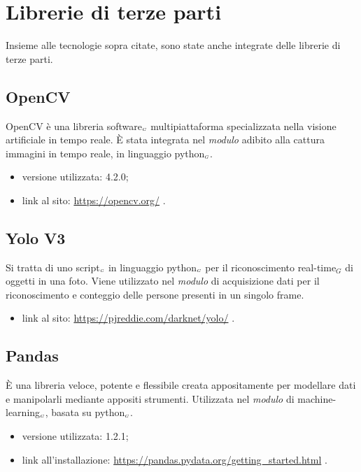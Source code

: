 \section{Librerie di terze parti}\label{LibrerieDiTerzeParti}
Insieme alle tecnologie sopra citate, sono state anche integrate delle librerie di terze parti.

\subsection{OpenCV}\label{LibrerieOpenCV}
OpenCV è una libreria software$_{\scaleto{G}{3pt}}$ multipiattaforma specializzata nella visione artificiale in tempo reale.
È stata integrata nel \textit{modulo} adibito alla cattura immagini in tempo reale, in linguaggio python$_{\scaleto{G}{3pt}}$.

\begin{itemize}
  \item versione utilizzata: 4.2.0;
  \item link al sito: \url{https://opencv.org/} .
\end{itemize}

\subsection{Yolo V3}\label{LibrerieYoloV3}
Si tratta di uno script$_{\scaleto{G}{3pt}}$ in linguaggio python$_{\scaleto{G}{3pt}}$ per il riconoscimento real-time$_G$ di oggetti in una foto.
Viene utilizzato nel \textit{modulo} di acquisizione dati per il riconoscimento e conteggio delle persone presenti in un singolo frame.

\begin{itemize}
  \item link al sito: \url{https://pjreddie.com/darknet/yolo/} .
\end{itemize}

\subsection{Pandas}\label{LibreriePandas}
È una libreria veloce, potente e flessibile creata appositamente per modellare dati e manipolarli mediante appositi strumenti.
Utilizzata nel \textit{modulo} di machine-learning$_{\scaleto{G}{3pt}}$, basata su python$_{\scaleto{G}{3pt}}$.

\begin{itemize}
  \item versione utilizzata: 1.2.1;
  \item link all'installazione: \url{https://pandas.pydata.org/getting_started.html} .
\end{itemize}

